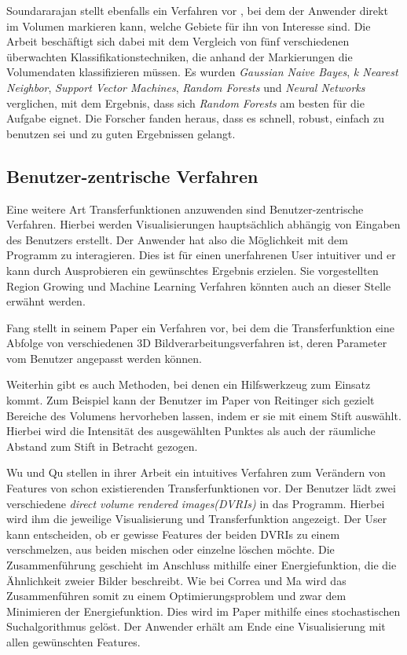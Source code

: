 Soundararajan stellt ebenfalls ein Verfahren vor \cite{soundararajan2015learning}, bei dem der Anwender direkt im Volumen markieren kann, welche Gebiete für ihn von Interesse sind.
\newline
Die Arbeit beschäftigt sich dabei mit dem Vergleich von fünf verschiedenen überwachten Klassifikationstechniken, die anhand der Markierungen die Volumendaten klassifizieren müssen. Es wurden \textit{Gaussian Naive Bayes}, \textit{k Nearest Neighbor}, \textit{Support Vector Machines}, \textit{Random Forests} und \textit{Neural Networks} verglichen, mit dem Ergebnis, dass sich \textit{Random Forests} am besten für die Aufgabe eignet. Die Forscher fanden heraus, dass es schnell, robust, einfach zu benutzen sei und zu guten Ergebnissen gelangt.



\subsection{Benutzer-zentrische Verfahren}

Eine weitere Art Transferfunktionen anzuwenden sind Benutzer-zentrische Verfahren. Hierbei werden Visualisierungen hauptsächlich abhängig von Eingaben des Benutzers erstellt.
Der Anwender hat also die Möglichkeit mit dem Programm zu interagieren. Dies ist für einen unerfahrenen User intuitiver und er kann durch Ausprobieren ein gewünschtes Ergebnis erzielen.
Sie vorgestellten Region Growing und Machine Learning Verfahren könnten auch an dieser Stelle erwähnt werden.


Fang stellt in seinem Paper \cite{fang1998image} ein Verfahren vor, bei dem die  Transferfunktion eine Abfolge von verschiedenen 3D Bildverarbeitungsverfahren ist, deren Parameter vom Benutzer angepasst werden können.


Weiterhin gibt es auch Methoden, bei denen ein Hilfswerkzeug zum Einsatz kommt. Zum Beispiel kann der Benutzer im Paper von Reitinger \cite{reitinger2004user} sich gezielt Bereiche des Volumens hervorheben lassen, indem er sie mit einem Stift auswählt.
Hierbei wird die Intensität des ausgewählten Punktes als auch der räumliche Abstand zum Stift in Betracht gezogen.


Wu und Qu stellen in ihrer Arbeit \cite{wu2007interactive} ein intuitives Verfahren zum Verändern von Features von schon existierenden Transferfunktionen vor.
Der Benutzer lädt zwei verschiedene \textit{direct volume rendered images(DVRIs)} in das Programm. Hierbei wird ihm die jeweilige Visualisierung und Transferfunktion angezeigt. Der User kann entscheiden, ob er gewisse Features der beiden DVRIs zu einem verschmelzen, aus beiden mischen oder einzelne löschen möchte.
Die Zusammenführung geschieht im Anschluss mithilfe einer Energiefunktion, die die Ähnlichkeit zweier Bilder beschreibt. Wie bei Correa und Ma \cite{correa2009visibility} wird das Zusammenführen somit zu einem Optimierungsproblem und zwar dem Minimieren der Energiefunktion. Dies wird im Paper mithilfe eines stochastischen Suchalgorithmus gelöst.
Der Anwender erhält am Ende eine Visualisierung mit allen gewünschten Features.



